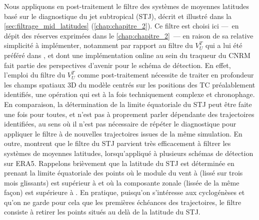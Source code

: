 \documentclass[../main.tex]{subfiles}
\begin{document}
Nous appliquons en post-traitement le filtre des systèmes de moyennes latitudes basé sur le diagnostique du jet subtropical (STJ), décrit et illustré dans la
\cref{sec:filtrage_mid_latitudes} (\cref{chap:chapitre_2}). Ce filtre est choisi ici ---~en dépit des réserves exprimées dans le \cref{chap:chapitre_2}~--- en
raison de sa relative simplicité à implémenter, notamment par rapport au filtre du $V_U^T$ qui a lui été préféré dans \textcite{dulac_assessing_2023}, et dont
une implémentation online au sein du traqueur du CNRM fait partie des perspectives d'avenir pour le schéma de détection. En effet, l'emploi du filtre du $V_U^T$
comme post-traitement nécessite de traiter en profondeur les champs spatiaux 3D du modèle centrés sur les positions des TC préalablement identifiés, une
opération qui est à la fois techniquement complexe et chronophage. En comparaison, la détermination de la limite équatoriale du STJ peut être faite une fois
pour toutes, et n'est pas à proprement parler dépendante des trajectoires identifiées, au sens où il n'est pas nécessaire de répéter le diagnostique pour
appliquer le filtre à de nouvelles trajectoires issues de la même simulation. En outre, \textcite{bourdin_intercomparison_2022} montrent que le filtre du STJ
parvient très efficacement à filtrer les systèmes de moyennes latitudes, lorsqu'appliqué à plusieurs schémas de détection sur ERA5. Rappelons brièvement que la
latitude du STJ est déterminée en prenant la limite équatoriale des points où le module du vent à  (lissé sur trois mois glissants) est supérieur à
 et où la composante zonale (lissée de la même façon) est supérieure à . En pratique, puisqu'on s'intéresse aux cyclogénèses et qu'on ne garde
pour cela que les premières échéances des trajectoires, le filtre consiste à retirer les points situés au delà de la latitude du STJ.
\end{document}
